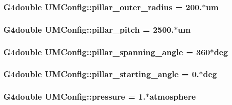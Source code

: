 \subsubsection[{pillar\+\_\+outer\+\_\+radius}]{\setlength{\rightskip}{0pt plus 5cm}G4double U\+M\+Config\+::pillar\+\_\+outer\+\_\+radius = 200.$\ast$um}\label{structUMConfig_ad952040a5b58ca3cbf4023319f4a2af6}
\hypertarget{structUMConfig_a1beecce75e7f95f04f4bc28f1bb555e7}{}
\subsubsection[{pillar\+\_\+pitch}]{\setlength{\rightskip}{0pt plus 5cm}G4double U\+M\+Config\+::pillar\+\_\+pitch = 2500.$\ast$um}\label{structUMConfig_a1beecce75e7f95f04f4bc28f1bb555e7}
\hypertarget{structUMConfig_a6404764724906f77433b423292c7a3c0}{}
\subsubsection[{pillar\+\_\+spanning\+\_\+angle}]{\setlength{\rightskip}{0pt plus 5cm}G4double U\+M\+Config\+::pillar\+\_\+spanning\+\_\+angle = 360$\ast$deg}\label{structUMConfig_a6404764724906f77433b423292c7a3c0}
\hypertarget{structUMConfig_a0dcfd82af061495badf0a1c322b38484}{}
\subsubsection[{pillar\+\_\+starting\+\_\+angle}]{\setlength{\rightskip}{0pt plus 5cm}G4double U\+M\+Config\+::pillar\+\_\+starting\+\_\+angle = 0.$\ast$deg}\label{structUMConfig_a0dcfd82af061495badf0a1c322b38484}
\hypertarget{structUMConfig_a2c2d0d2d44efd10c2e60e8814197f95e}{}
\subsubsection[{pressure}]{\setlength{\rightskip}{0pt plus 5cm}G4double U\+M\+Config\+::pressure = 1.$\ast$atmosphere}\label{structUMConfig_a2c2d0d2d44efd10c2e60e8814197f95e}
\hypertarget{structUMConfig_a0a439e9bae5313eae0b610d4fc48a92e}{}
